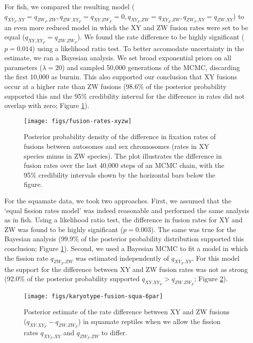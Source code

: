 For fish, we compared the resulting model ($q_{XY_F.XY} = q_{ZW_F.ZW}, q_{ZW.XY_F}=q_{XY.ZW_F}=\text{0}, q_{XY_F.ZW}=q_{XY_Z.ZW}, q_{ZW_F.XY}=q_{ZW.XY}$) to an even more reduced model in which the XY and ZW fusion rates were set to be equal ($q_{XY.XY_F}=q_{ZW.ZW_F}$). We found the rate difference to be highly significant ($p=\text{0.014}$) using a likelihood ratio test. To better accomodate uncertainty in the estimate, we ran a Bayesian analysis. We set broad exponential priors on all parameters ($\lambda=20$) and sampled 50,000 generations of the MCMC, discarding the first 10,000 as burnin. This also supported our conclusion that XY fusions occur at a higher rate than ZW fusions (98.6\% of the posterior probability supported this and the 95\% credibility interval for the difference in rates did not overlap with zero; Figure \ref{fig:pp-fuse-final}).

\begin{figure}
\centering
\texttt{[image: figs/fusion-rates-xyzw]}
\caption[Fusion rate difference between XY and ZW systems]{Posterior probability density of the difference in fixation rates of fusions between autosomes and sex chromosomes (rates in XY species minus in ZW species). The plot illustrates the difference in fusion rates over the last 40,000 steps of an MCMC chain, with the 95\% credibility intervals shown by the horizontal bars below the figure.}
\label{fig:pp-fuse-final}
\end{figure}

For the squamate data, we took two approaches. First, we assumed that the `equal fission rates model' was indeed reasonable and performed the same analysis as in fish. Using a likelihood ratio test, the difference in fusion rates for XY and ZW was found to be highly significant ($p=\text{0.003}$). The same was true for the Bayesian analysis (99.9\% of the posterior probability distribution supported this conclusion; Figure \ref{fig:pp-fuse-final}). Second, we used a Bayesian MCMC to fit a model in which the fission rate $q_{ZW_F.ZW}$ was estimated independently of $q_{XY_F.XY}$. For this model the support for the difference between XY and ZW fusion rates was not as strong (92.0\% of the posterior probability supported $q_{XY.XY_F} > q_{ZW.ZW_F}$; Figure \ref{fig:squa-dif}).

\begin{figure}[p]
\centering
\texttt{[image: figs/karyotype-fusion-squa-6par]}
\caption[Fusion rate difference between XY and ZW systems (alternate model)]{Posterior estimate of the rate difference between XY and ZW fusions ($q_{XY.XY_F} - q_{ZW.ZW_F}$) in squamate reptiles when we allow the fission rates $q_{XY_F.XY}$ and $q_{ZW_F.ZW}$ to differ.}
\label{fig:squa-dif}
\end{figure}

